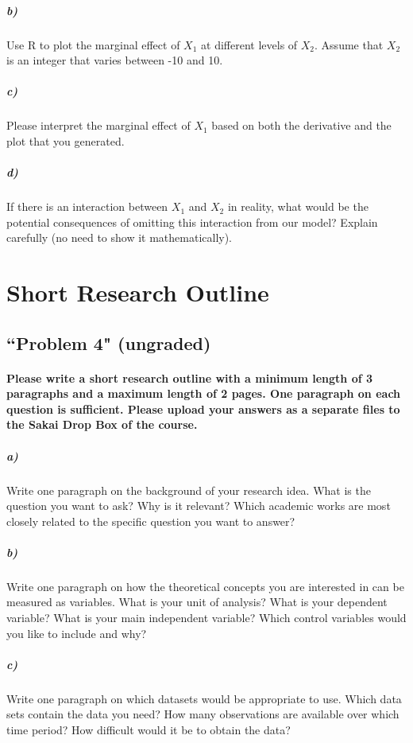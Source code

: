 \documentclass[12pt]{article}
\begin{document}
\subparagraph{b)} Use R to plot the marginal effect of $X_1$ at different levels of $X_2$. Assume that $X_2$ is an integer that varies between -10 and 10.

\subparagraph{c)} Please interpret the marginal effect of $X_1$ based on both the derivative and the plot that you generated.

\subparagraph{d)} If there is an interaction between $X_1$ and $X_2$ in reality, what would be the potential consequences of omitting this interaction from our model? Explain carefully (no need to show it mathematically).



\section*{Short Research Outline}

\subsection*{``Problem 4" (ungraded)}

\paragraph{Please write a short research outline with a minimum length of 3 paragraphs and a maximum length of 2 pages. One paragraph on each question is sufficient. Please upload your answers as a separate files to the Sakai Drop Box of the course.}

\subparagraph{a)} Write one paragraph on the background of your research idea. What is the question you want to ask? Why is it relevant? Which academic works are most closely related to the specific question you want to answer?

\subparagraph{b)} Write one paragraph on how the theoretical concepts you are interested in can be measured as variables. What is your unit of analysis? What is your dependent variable? What is your main independent variable? Which control variables would you like to include and why?

\subparagraph{c)} Write one paragraph on which datasets would be appropriate to use. Which data sets contain the data you need? How many observations are available over which time period? How difficult would it be to obtain the data?
\end{document}
